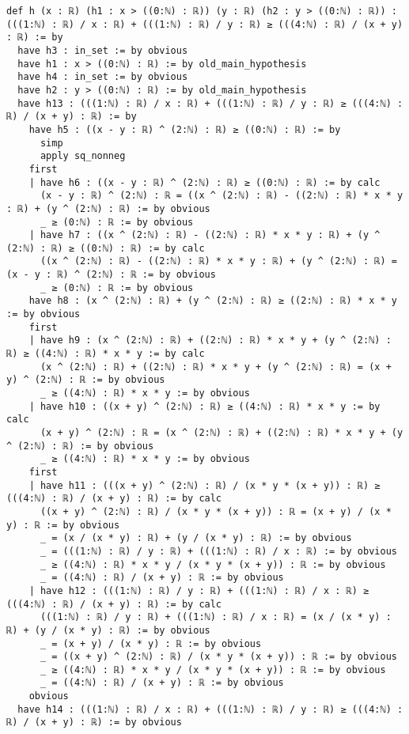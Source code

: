 \documentclass{article}
\begin{document}
\begin{tcolorbox}[colback=white!10, width=\linewidth]
\begin{lstlisting}[language=Lean4]
def h (x : ℝ) (h1 : x > ((0:ℕ) : ℝ)) (y : ℝ) (h2 : y > ((0:ℕ) : ℝ)) : (((1:ℕ) : ℝ) / x : ℝ) + (((1:ℕ) : ℝ) / y : ℝ) ≥ (((4:ℕ) : ℝ) / (x + y) : ℝ) := by
  have h3 : in_set := by obvious
  have h1 : x > ((0:ℕ) : ℝ) := by old_main_hypothesis
  have h4 : in_set := by obvious
  have h2 : y > ((0:ℕ) : ℝ) := by old_main_hypothesis
  have h13 : (((1:ℕ) : ℝ) / x : ℝ) + (((1:ℕ) : ℝ) / y : ℝ) ≥ (((4:ℕ) : ℝ) / (x + y) : ℝ) := by
    have h5 : ((x - y : ℝ) ^ (2:ℕ) : ℝ) ≥ ((0:ℕ) : ℝ) := by
      simp
      apply sq_nonneg
    first
    | have h6 : ((x - y : ℝ) ^ (2:ℕ) : ℝ) ≥ ((0:ℕ) : ℝ) := by calc
      (x - y : ℝ) ^ (2:ℕ) : ℝ = ((x ^ (2:ℕ) : ℝ) - ((2:ℕ) : ℝ) * x * y : ℝ) + (y ^ (2:ℕ) : ℝ) := by obvious
      _ ≥ (0:ℕ) : ℝ := by obvious
    | have h7 : ((x ^ (2:ℕ) : ℝ) - ((2:ℕ) : ℝ) * x * y : ℝ) + (y ^ (2:ℕ) : ℝ) ≥ ((0:ℕ) : ℝ) := by calc
      ((x ^ (2:ℕ) : ℝ) - ((2:ℕ) : ℝ) * x * y : ℝ) + (y ^ (2:ℕ) : ℝ) = (x - y : ℝ) ^ (2:ℕ) : ℝ := by obvious
      _ ≥ (0:ℕ) : ℝ := by obvious
    have h8 : (x ^ (2:ℕ) : ℝ) + (y ^ (2:ℕ) : ℝ) ≥ ((2:ℕ) : ℝ) * x * y := by obvious
    first
    | have h9 : (x ^ (2:ℕ) : ℝ) + ((2:ℕ) : ℝ) * x * y + (y ^ (2:ℕ) : ℝ) ≥ ((4:ℕ) : ℝ) * x * y := by calc
      (x ^ (2:ℕ) : ℝ) + ((2:ℕ) : ℝ) * x * y + (y ^ (2:ℕ) : ℝ) = (x + y) ^ (2:ℕ) : ℝ := by obvious
      _ ≥ ((4:ℕ) : ℝ) * x * y := by obvious
    | have h10 : ((x + y) ^ (2:ℕ) : ℝ) ≥ ((4:ℕ) : ℝ) * x * y := by calc
      (x + y) ^ (2:ℕ) : ℝ = (x ^ (2:ℕ) : ℝ) + ((2:ℕ) : ℝ) * x * y + (y ^ (2:ℕ) : ℝ) := by obvious
      _ ≥ ((4:ℕ) : ℝ) * x * y := by obvious
    first
    | have h11 : (((x + y) ^ (2:ℕ) : ℝ) / (x * y * (x + y)) : ℝ) ≥ (((4:ℕ) : ℝ) / (x + y) : ℝ) := by calc
      ((x + y) ^ (2:ℕ) : ℝ) / (x * y * (x + y)) : ℝ = (x + y) / (x * y) : ℝ := by obvious
      _ = (x / (x * y) : ℝ) + (y / (x * y) : ℝ) := by obvious
      _ = (((1:ℕ) : ℝ) / y : ℝ) + (((1:ℕ) : ℝ) / x : ℝ) := by obvious
      _ ≥ ((4:ℕ) : ℝ) * x * y / (x * y * (x + y)) : ℝ := by obvious
      _ = ((4:ℕ) : ℝ) / (x + y) : ℝ := by obvious
    | have h12 : (((1:ℕ) : ℝ) / y : ℝ) + (((1:ℕ) : ℝ) / x : ℝ) ≥ (((4:ℕ) : ℝ) / (x + y) : ℝ) := by calc
      (((1:ℕ) : ℝ) / y : ℝ) + (((1:ℕ) : ℝ) / x : ℝ) = (x / (x * y) : ℝ) + (y / (x * y) : ℝ) := by obvious
      _ = (x + y) / (x * y) : ℝ := by obvious
      _ = ((x + y) ^ (2:ℕ) : ℝ) / (x * y * (x + y)) : ℝ := by obvious
      _ ≥ ((4:ℕ) : ℝ) * x * y / (x * y * (x + y)) : ℝ := by obvious
      _ = ((4:ℕ) : ℝ) / (x + y) : ℝ := by obvious
    obvious
  have h14 : (((1:ℕ) : ℝ) / x : ℝ) + (((1:ℕ) : ℝ) / y : ℝ) ≥ (((4:ℕ) : ℝ) / (x + y) : ℝ) := by obvious

\end{lstlisting}
\end{tcolorbox}
\end{document}
